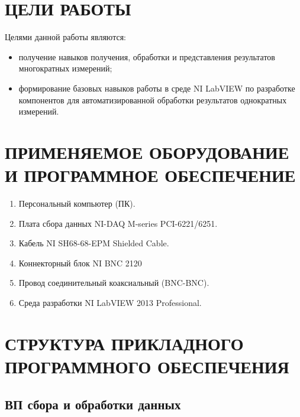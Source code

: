 \documentclass[a4paper,14pt]{article}
\begin{document}

\tableofcontents
\pagebreak

\section{ЦЕЛИ РАБОТЫ}
Целями данной работы являются:

\begin{itemize}
    \item получение навыков получения, обработки и представления результатов многократных измерений;
    \item формирование базовых навыков работы в среде NI LabVIEW по разработке компонентов для автоматизированной обработки результатов однократных измерений.
\end{itemize}

\section{ПРИМЕНЯЕМОЕ ОБОРУДОВАНИЕ И ПРОГРАММНОЕ ОБЕСПЕЧЕНИЕ}

\begin{enumerate}
    \item    Персональный компьютер (ПК).
    \item    Плата сбора данных NI-DAQ M-series PCI-6221/6251.
    \item    Кабель NI SH68-68-EPM Shielded Cable.
    \item    Коннекторный блок NI BNC 2120
    \item    Провод соединительный коаксиальный (BNC-BNC).
    \item    Среда разработки NI LabVIEW 2013 Professional.
\end{enumerate}


\section{СТРУКТУРА ПРИКЛАДНОГО     ПРОГРАММНОГО ОБЕСПЕЧЕНИЯ}
\subsection{ВП сбора и обработки данных}
\end{document}
